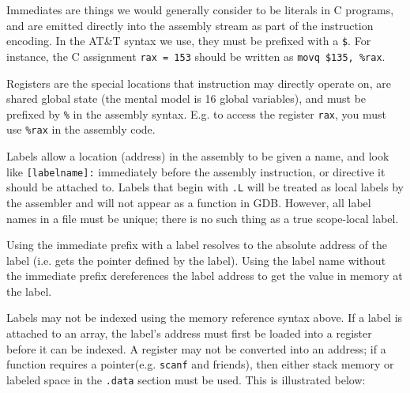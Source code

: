 \documentclass[11pt]{article}
\begin{document}
Immediates are things we would generally consider to be literals in C programs, and are
emitted directly into the assembly stream as part of the instruction encoding. In the
AT\&T syntax we use, they must be prefixed with a \texttt{\$}. For instance, the C
assignment \texttt{rax = 153} should be written as \texttt{movq \$135, \%rax}.

Registers are the special locations that instruction may directly operate on, are shared
global state (the mental model is 16 global variables), and must be prefixed by
\texttt{\%} in the assembly syntax. E.g. to access the register \texttt{rax}, you must use
\texttt{\%rax} in the assembly code.

Labels allow a location (address) in the assembly to be given a name, and look like
\texttt{[labelname]:} immediately before the assembly instruction, or directive it should
be attached to. Labels that begin with \texttt{.L} will be treated as local labels by the
assembler and will not appear as a function in GDB. However, all label names in a file
must be unique; there is no such thing as a true scope-local label.

Using the immediate prefix with a label resolves to the absolute address of the label (i.e.
gets the pointer defined by the label). Using the label name without the immediate prefix
dereferences the label address to get the value in memory at the label.

Labels may not be indexed using the memory reference syntax above. If a label is attached
to an array, the label's address must first be loaded into a register before it can be
indexed. A register may not be converted into an address; if a function requires a
pointer(e.g. \texttt{scanf} and friends), then either stack memory or labeled space in the
\texttt{.data} section must be used. This is illustrated below:
\end{document}
